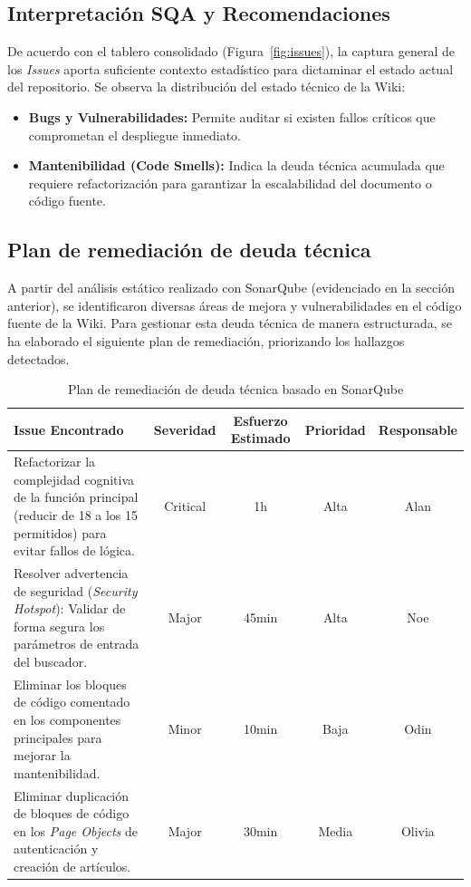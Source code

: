 \documentclass[12pt]{article}
\begin{document}
\subsection{Interpretación SQA y Recomendaciones}
De acuerdo con el tablero consolidado (Figura~\ref{fig:issues}), la captura general de los \textit{Issues} aporta suficiente contexto estadístico para dictaminar el estado actual del repositorio. Se observa la distribución del estado técnico de la Wiki:

\begin{itemize}
    \item \textbf{Bugs y Vulnerabilidades:} Permite auditar si existen fallos críticos que comprometan el despliegue inmediato.
    \item \textbf{Mantenibilidad (Code Smells):} Indica la deuda técnica acumulada que requiere refactorización para garantizar la escalabilidad del documento o código fuente.
\end{itemize}

\subsection{Plan de remediación de deuda técnica}

A partir del análisis estático realizado con SonarQube (evidenciado en la sección anterior), se identificaron diversas áreas de mejora y vulnerabilidades en el código fuente de la Wiki. Para gestionar esta deuda técnica de manera estructurada, se ha elaborado el siguiente plan de remediación, priorizando los hallazgos detectados.

\begin{table}[h]
    \centering
    \caption{Plan de remediación de deuda técnica basado en SonarQube}
    \vspace{0.2cm}
    \begin{tabularx}{\textwidth}{>{\raggedright\arraybackslash}X c c c c}
        \toprule
        \textbf{Issue Encontrado} & \textbf{Severidad} & \textbf{Esfuerzo Estimado} & \textbf{Prioridad} & \textbf{Responsable} \\
        \midrule
        Refactorizar la complejidad cognitiva de la función principal (reducir de 18 a los 15 permitidos) para evitar fallos de lógica. & Critical & 1h & Alta & Alan \\
        \addlinespace
        Resolver advertencia de seguridad (\textit{Security Hotspot}): Validar de forma segura los parámetros de entrada del buscador. & Major & 45min & Alta & Noe \\
        \addlinespace
        Eliminar los bloques de código comentado en los componentes principales para mejorar la mantenibilidad. & Minor & 10min & Baja & Odin \\
        \addlinespace
        Eliminar duplicación de bloques de código en los \textit{Page Objects} de autenticación y creación de artículos. & Major & 30min & Media & Olivia \\
        \bottomrule
    \end{tabularx}
\end{table}
\end{document}
